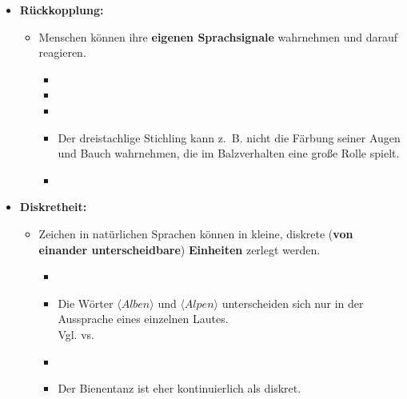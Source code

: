 \begin{frame}
	
\begin{itemize}
	\item<1-> \textbf{Rückkopplung:}
	
	\begin{itemize}
		\item<1-> Menschen können ihre \textbf{eigenen Sprachsignale} wahrnehmen und darauf reagieren.
		
		\begin{itemize}
			\item[]
			\item<2->[$\rightarrow$] 
			\item[]
			\item<2->[$\rightarrow$] Der dreistachlige Stichling kann z.~B. nicht die Färbung seiner Augen und Bauch wahrnehmen, die im Balzverhalten eine große Rolle spielt.
			\item[]
		\end{itemize}
	
	\end{itemize}
			
	\item<3-> \textbf{Diskretheit:}
			
	\begin{itemize}
		\item<3-> Zeichen in natürlichen Sprachen können in kleine, diskrete (\textbf{von einander unterscheidbare}) \textbf{Einheiten} zerlegt werden.
				
		\begin{itemize}
			\item[]
			\item<4->[$\rightarrow$] Die Wörter $\langle Alben \rangle$ und $\langle Alpen \rangle$ unterscheiden sich nur in der Aussprache eines einzelnen Lautes.\\
					Vgl.  vs. 
			\item[]
			\item<4->[$\rightarrow$] Der Bienentanz ist eher kontinuierlich als diskret.						
		\end{itemize}
	
	\end{itemize}

\end{itemize}

\end{frame}


